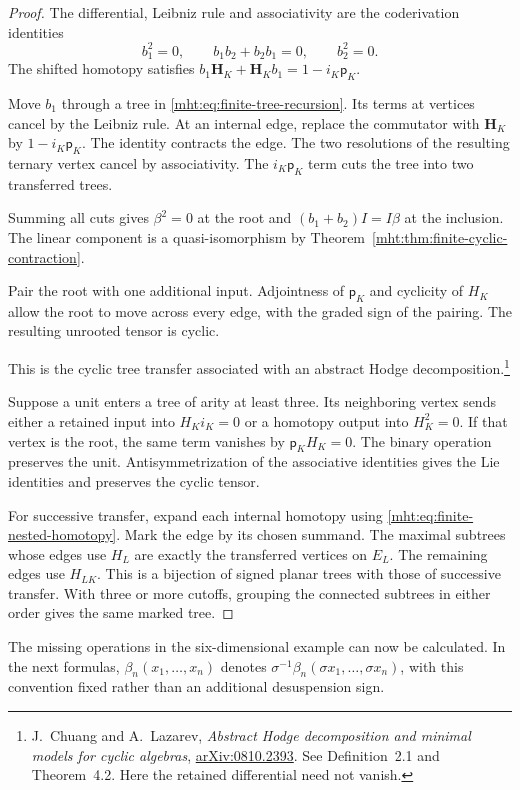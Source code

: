 \begin{proof}
The differential, Leibniz rule and associativity are the coderivation
identities
\[
 b_1^2=0,\qquad b_1b_2+b_2b_1=0,\qquad b_2^2=0.
\]
The shifted homotopy satisfies
$b_1\mathbf H_K+\mathbf H_Kb_1=1-i_K\mathsf p_K$.

Move $b_1$ through a tree in
\eqref{mht:eq:finite-tree-recursion}. Its terms at vertices cancel
by the Leibniz rule. At an internal edge, replace the commutator
with $\mathbf H_K$ by $1-i_K\mathsf p_K$. The identity contracts the edge.
The two resolutions of the resulting ternary vertex cancel by
associativity. The $i_K\mathsf p_K$ term cuts the tree into two transferred
trees.

Summing all cuts gives $\beta^2=0$ at the root and
$(b_1+b_2)I=I\beta$ at the inclusion. The linear component is a
quasi-isomorphism by Theorem~\ref{mht:thm:finite-cyclic-contraction}.

Pair the root with one additional input. Adjointness of $\mathsf p_K$ and
cyclicity of $H_K$ allow the root to move across every edge, with
the graded sign of the pairing. The resulting unrooted tensor is
cyclic.

This is the cyclic tree transfer associated with an abstract
Hodge decomposition.\footnote{J.~Chuang and A.~Lazarev,
\emph{Abstract Hodge decomposition and minimal models for cyclic
algebras}, \href{https://arxiv.org/abs/0810.2393}{arXiv:0810.2393}.
See Definition~2.1 and Theorem~4.2.
Here the retained differential need not vanish.}

Suppose a unit enters a tree of arity at least three. Its neighboring
vertex sends either a retained input into $H_Ki_K=0$ or a homotopy
output into $H_K^2=0$. If that vertex is the root, the
same term vanishes by $\mathsf p_KH_K=0$. The binary operation preserves
the unit. Antisymmetrization of the associative identities gives
the Lie identities and preserves the cyclic tensor.

For successive transfer, expand each internal homotopy using
\eqref{mht:eq:finite-nested-homotopy}. Mark the edge by its chosen
summand. The maximal subtrees whose edges use $H_L$ are exactly
the transferred vertices on $E_L$. The remaining edges use $H_{LK}$.
This is a bijection of signed planar trees with those of successive
transfer. With three or more cutoffs, grouping the connected subtrees
in either order gives the same marked tree.
\end{proof}

The missing operations in the six-dimensional example can now be
calculated. In the next formulas, $\beta_n(x_1,\ldots,x_n)$ denotes
$\sigma^{-1}\beta_n(\sigma x_1,\ldots,\sigma x_n)$, with this
convention fixed rather than an additional desuspension sign.

